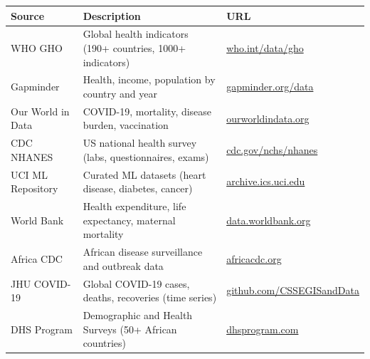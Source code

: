 \documentclass[12pt,a4paper,twoside]{book}
\begin{document}
\begin{longtable}{p{4cm}p{8cm}p{3cm}}
\toprule
\textbf{Source} & \textbf{Description} & \textbf{URL} \\
\midrule
WHO GHO & Global health indicators (190+ countries, 1000+ indicators) & \url{who.int/data/gho} \\
Gapminder & Health, income, population by country and year & \url{gapminder.org/data} \\
Our World in Data & COVID-19, mortality, disease burden, vaccination & \url{ourworldindata.org} \\
CDC NHANES & US national health survey (labs, questionnaires, exams) & \url{cdc.gov/nchs/nhanes} \\
UCI ML Repository & Curated ML datasets (heart disease, diabetes, cancer) & \url{archive.ics.uci.edu} \\
World Bank & Health expenditure, life expectancy, maternal mortality & \url{data.worldbank.org} \\
Africa CDC & African disease surveillance and outbreak data & \url{africacdc.org} \\
JHU COVID-19 & Global COVID-19 cases, deaths, recoveries (time series) & \url{github.com/CSSEGISandData} \\
DHS Program & Demographic and Health Surveys (50+ African countries) & \url{dhsprogram.com} \\
\bottomrule
\end{longtable}




\printindex
\end{document}
